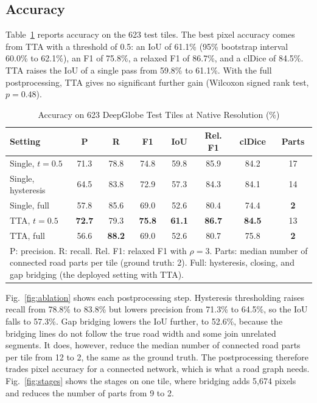 \documentclass{ieeeaccess}
\begin{document}
\subsection{Accuracy}

Table~\ref{tab:acc} reports accuracy on the 623 test tiles. The best pixel accuracy comes from TTA with a threshold of 0.5: an IoU of 61.1\% (95\% bootstrap interval 60.0\% to 62.1\%), an F1 of 75.8\%, a relaxed F1 of 86.7\%, and a clDice of 84.5\%. TTA raises the IoU of a single pass from 59.8\% to 61.1\%. With the full postprocessing, TTA gives no significant further gain (Wilcoxon signed rank test, $p = 0.48$).

\begin{table}[t]
\caption{Accuracy on 623 DeepGlobe Test Tiles at Native Resolution (\%)}
\label{tab:acc}
\setlength{\tabcolsep}{3pt}
\tablebodyfont
\begin{tabular}{|l|c|c|c|c|c|c|c|}
\hline
Setting & P & R & F1 & IoU & Rel. F1 & clDice & Parts \\
\hline
Single, $t = 0.5$ & 71.3 & 78.8 & 74.8 & 59.8 & 85.9 & 84.2 & 17 \\
Single, hysteresis & 64.5 & 83.8 & 72.9 & 57.3 & 84.3 & 84.1 & 14 \\
Single, full & 57.8 & 85.6 & 69.0 & 52.6 & 80.4 & 74.4 & \textbf{2} \\
TTA, $t = 0.5$ & \textbf{72.7} & 79.3 & \textbf{75.8} & \textbf{61.1} & \textbf{86.7} & \textbf{84.5} & 13 \\
TTA, full & 56.6 & \textbf{88.2} & 69.0 & 52.6 & 80.7 & 75.8 & \textbf{2} \\
\hline
\multicolumn{8}{p{232pt}}{P: precision. R: recall. Rel. F1: relaxed F1 with $\rho = 3$. Parts: median number of connected road parts per tile (ground truth: 2). Full: hysteresis, closing, and gap bridging (the deployed setting with TTA).}
\end{tabular}
\end{table}

Fig.~\ref{fig:ablation} shows each postprocessing step. Hysteresis thresholding raises recall from 78.8\% to 83.8\% but lowers precision from 71.3\% to 64.5\%, so the IoU falls to 57.3\%. Gap bridging lowers the IoU further, to 52.6\%, because the bridging lines do not follow the true road width and some join unrelated segments. It does, however, reduce the median number of connected road parts per tile from 12 to 2, the same as the ground truth. The postprocessing therefore trades pixel accuracy for a connected network, which is what a road graph needs. Fig.~\ref{fig:stages} shows the stages on one tile, where bridging adds 5,674 pixels and reduces the number of parts from 9 to 2.
\end{document}
